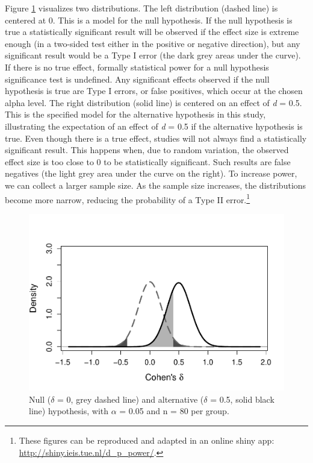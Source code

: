\documentclass[
  english,
  ,jou, a4paper,floatsintext]{apa6}
\begin{document}
Figure \ref{fig:power-3} visualizes two distributions. The left distribution (dashed line) is centered at 0. This is a model for the null hypothesis. If the null hypothesis is true a statistically significant result will be observed if the effect size is extreme enough (in a two-sided test either in the positive or negative direction), but any significant result would be a Type I error (the dark grey areas under the curve). If there is no true effect, formally statistical power for a null hypothesis significance test is undefined. Any significant effects observed if the null hypothesis is true are Type I errors, or false positives, which occur at the chosen alpha level. The right distribution (solid line) is centered on an effect of \emph{d} = 0.5. This is the specified model for the alternative hypothesis in this study, illustrating the expectation of an effect of \emph{d} = 0.5 if the alternative hypothesis is true. Even though there is a true effect, studies will not always find a statistically significant result. This happens when, due to random variation, the observed effect size is too close to 0 to be statistically significant. Such results are false negatives (the light grey area under the curve on the right). To increase power, we can collect a larger sample size. As the sample size increases, the distributions become more narrow, reducing the probability of a Type II error.\footnote{These figures can be reproduced and adapted in an online shiny app: \url{http://shiny.ieis.tue.nl/d_p_power/}.}

\begin{figure}
\centering
\includegraphics{sample_size_justification_files/figure-latex/power-3-1.pdf}
\caption{\label{fig:power-3}Null (\(\delta\) = 0, grey dashed line) and alternative (\(\delta\) = 0.5, solid black line) hypothesis, with \(\alpha\) = 0.05 and n = 80 per group.}
\end{figure}
\end{document}
